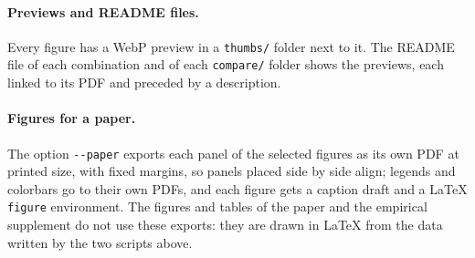 \documentclass[11pt]{article}
\newcommand{\code}[1]{\texttt{#1}}
\begin{document}
\paragraph{Previews and README files.} Every figure has a WebP preview in a \code{thumbs/} folder next to it. The README file of each combination and of each \code{compare/} folder shows the previews, each linked to its PDF and preceded by a description.

\paragraph{Figures for a paper.} The option \code{-{}-paper} exports each panel of the selected figures as its own PDF at printed size, with fixed margins, so panels placed side by side align; legends and colorbars go to their own PDFs, and each figure gets a caption draft and a \LaTeX{} \code{figure} environment. The figures and tables of the paper and the empirical supplement do not use these exports: they are drawn in \LaTeX{} from the data written by the two scripts above.
\end{document}
